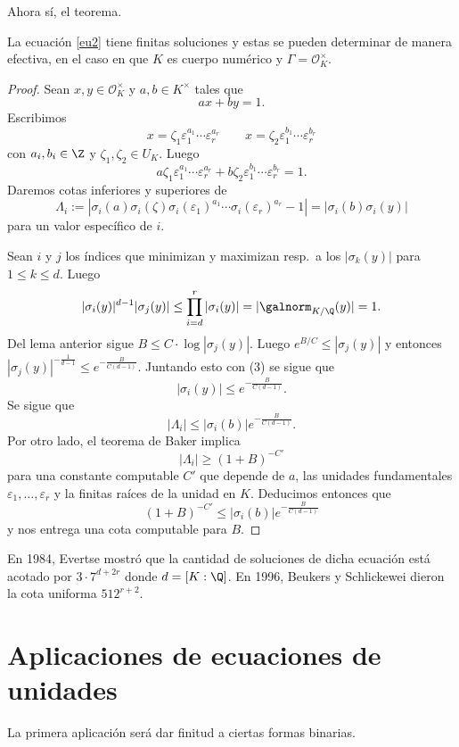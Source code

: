 \documentclass[11pt, reqno]{amsart}
\begin{document}
Ahora sí, el teorema.

\begin{thm}
	\label{SM2}
	La ecuación \eqref{eu2} tiene finitas soluciones y estas se pueden determinar de manera efectiva, en el caso en que $K$ es cuerpo numérico y $\Gamma=\mathcal{O}_K^{\times}$.
\end{thm}
\begin{proof}
	Sean $x,y\in \mathcal{O}_K^{\times}$ y $a,b\in K^{\times}$ tales que $$ax+by=1.$$ Escribimos $$x=\zeta_1\varepsilon_1^{a_1}\cdots\varepsilon_r^{a_r}\qquad x=\zeta_2\varepsilon_1^{b_1}\cdots\varepsilon_r^{b_r}$$ con $a_i,b_i\in \Z$ y $\zeta_1,\zeta_2\in U_K$. Luego $$a\zeta_1\varepsilon_1^{a_1}\cdots\varepsilon_r^{a_r}+b\zeta_2\varepsilon_1^{b_1}\cdots\varepsilon_r^{b_r}=1.$$ 
	Daremos cotas inferiores y superiores de
	\[
		\Lambda_i:=|\sigma_i(a)\sigma_i(\zeta)\sigma_i(\varepsilon_1)^{a_1}\cdots\sigma_i(\varepsilon_r)^{a_r}-1|=|\sigma_i(b)\sigma_i(y)|
	\]
	para un valor específico de $i$.

	Sean $i$ y $j$ los índices que minimizan y maximizan resp.\ a los $|\sigma_k(y)|$ para $1\leq k\leq d$. Luego \begin{equation}
		|\sigma_i(y)|^{d-1}|\sigma_j(y)|\leq \prod_{i=d}^r|\sigma_i(y)|=\lvert\galnorm_{K/\Q}(y)\rvert=1.
	\end{equation} Del lema anterior sigue $B\leq C\cdot \log|\sigma_j(y)|$. Luego $e^{B/C}\leq |\sigma_j(y)|$ y entonces $|\sigma_j(y)|^{-\frac{1}{d-1}}\leq e^{-\frac{B}{C(d-1)}}$. Juntando esto con (3) se sigue que $$|\sigma_i(y)|\leq e^{-\frac{B}{C(d-1)}}.$$ Se sigue que $$|\Lambda_i|\leq |\sigma_i(b)|e^{-\frac{B}{C(d-1)}}.$$ Por otro lado, el teorema de Baker implica $$|\Lambda_i|\geq (1+B)^{-C'}$$ para una constante computable $C'$ que depende de $a$, las unidades fundamentales $\varepsilon_1,\ldots,\varepsilon_r$ y la finitas raíces de la unidad en $K$. Deducimos entonces que $$(1+B)^{-C'}\leq |\sigma_i(b)|e^{-\frac{B}{C(d-1)}}$$ y nos entrega una cota computable para $B$. 
\end{proof}

En 1984, Evertse mostró que la cantidad de soluciones de dicha ecuación está acotado por $3\cdot 7^{d+2r}$ donde $d=[K:\Q]$. En 1996, Beukers y Schlickewei dieron la cota uniforma $512^{r+2}$.
\section{Aplicaciones de ecuaciones de unidades}

La primera aplicación será dar finitud a ciertas formas binarias.
\end{document}
